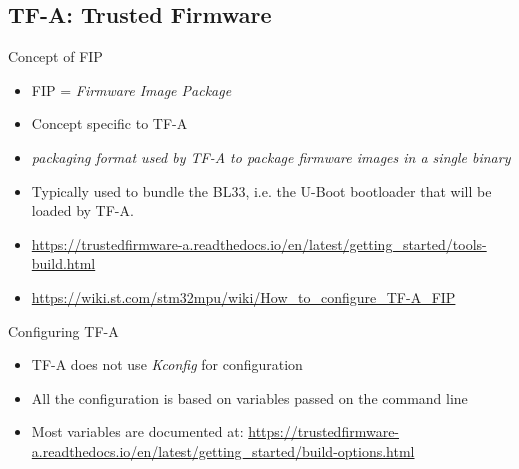 \subsection{TF-A: Trusted Firmware}

\begin{frame}{Concept of FIP}
  \begin{itemize}
  \item FIP = {\em Firmware Image Package}
  \item Concept specific to TF-A
  \item {\em packaging format used by TF-A to package firmware images
      in a single binary}
  \item Typically used to bundle the BL33, i.e. the U-Boot bootloader
    that will be loaded by TF-A.
  \item \url{https://trustedfirmware-a.readthedocs.io/en/latest/getting_started/tools-build.html}
  \item \url{https://wiki.st.com/stm32mpu/wiki/How_to_configure_TF-A_FIP}
  \end{itemize}
\end{frame}

\begin{frame}{Configuring TF-A}
  \begin{itemize}
  \item TF-A does not use {\em Kconfig} for configuration
  \item All the configuration is based on variables passed on the
     command line
  \item Most variables are documented at:
    \url{https://trustedfirmware-a.readthedocs.io/en/latest/getting_started/build-options.html}
  \end{itemize}
\end{frame}

